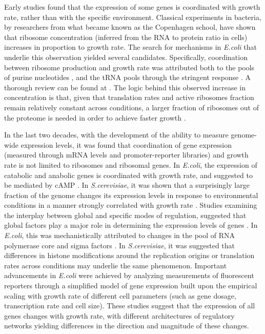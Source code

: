\documentclass[notitlepage]{article}
\begin{document}
Early studies found that the expression of some genes is coordinated with growth rate, rather than with the specific environment.
Classical experiments in bacteria, by researchers from what became known as the Copenhagen school, have shown that ribosome concentration (inferred from the RNA to protein ratio in cells) increases in proportion to growth rate\cite{Schaechter1958}.
The search for mechanisms in \emph{E.coli} that underlie this observation yielded several candidates.
Specifically, coordination between ribosome production and growth rate was attributed both to the pools of purine nucleotides \cite{Gourse1996,Gaal1997}, and the tRNA pools through the stringent response \cite{Chatterji2001,Brauer2008a}.
A thorough review can be found at \cite{Nomura1984}.
The logic behind this observed increase in concentration is that, given that translation rates and active ribosomes fraction remain relatively constant across conditions, a larger fraction of ribosomes out of the proteome is needed in order to achieve faster growth \cite{neidhardt1999a,dennis2004,Zaslaver2009}.

In the last two decades, with the development of the ability to measure genome-wide expression levels, it was found that coordination of gene expression (measured through mRNA levels and promoter-reporter libraries) and growth rate is not limited to ribosomes and ribosomal genes.
In \emph{E.coli}, the expression of catabolic and anabolic genes is coordinated with growth rate, and suggested to be mediated by cAMP \cite{Saldanha2004}.
In \emph{S.cerevisiae}, it was shown that a surprisingly large fraction of the genome changes its expression levels in response to environmental conditions in a manner strongly correlated with growth rate \cite{Keren2013a,Gasch2000,Castrillo2007,Zaslaver2009, Gerosa2013}.
Studies examining the interplay between global and specific modes of regulation, suggested that global factors play a major role in determining the expression levels of genes \cite{Gasch2000, Klumpp2009a,Scott2010, Berthoumieux2013}.
In \emph{E.coli}, this was mechanistically attributed to changes in the pool of RNA polymerase core and sigma factors \cite{Klumpp2008}.
In \emph{S.cerevisiae}, it was suggested that differences in histone modifications around the replication origins \cite{regenberg2006} or translation rates \cite{Gasch2000} across conditions may underlie the same phenomenon.
Important advancements in \emph{E.coli} were achieved by analyzing measurements of fluorescent reporters through a simplified model of gene expression built upon the empirical scaling with growth rate of different cell parameters (such as gene dosage, transcription rate and cell size)\cite{Klumpp2009a}.
These studies suggest that the expression of all genes changes with growth rate, with different architectures of regulatory networks yielding differences in the direction and magnitude of these changes. 
\end{document}
